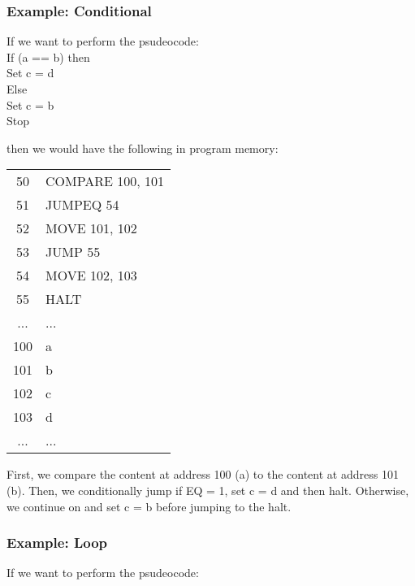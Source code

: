 \documentclass[]{article}
\begin{document}
\subsubsection{Example: Conditional}
\bigbreak

If we want to perform the psudeocode:\\

\setlength{\parindent}{0.5cm}\noindent
If (a == b) then\\
\indent Set c = d\\
Else\\
\indent Set c = b\\
Stop
\setlength{\parindent}{0pt}

then we would have the following in program memory: \\

\begin{center}
	\begin{tabular}{c|l|}\cline{2-2}
		50 & COMPARE 100, 101 \\\cline{2-2}
		51 & JUMPEQ 54 \\\cline{2-2}
		52 & MOVE 101, 102 \\\cline{2-2}
		53 & JUMP 55 \\\cline{2-2}
		54 & MOVE 102, 103 \\\cline{2-2}
		55 & HALT \\\cline{2-2}
		... & ... \\\cline{2-2}
		100 & a \\\cline{2-2}
		101 & b \\\cline{2-2}
		102 & c \\\cline{2-2}
		103 & d \\\cline{2-2}
		... & ... \\\cline{2-2}
	\end{tabular}
	\bigbreak
\end{center}

First, we compare the content at address 100 (a) to the content at address 101 (b). Then, we conditionally jump if EQ = 1, set c = d and then halt. Otherwise, we continue on and set c = b before jumping to the halt.\\

\subsubsection{Example: Loop}
\bigbreak

If we want to perform the psudeocode:\\
\end{document}
